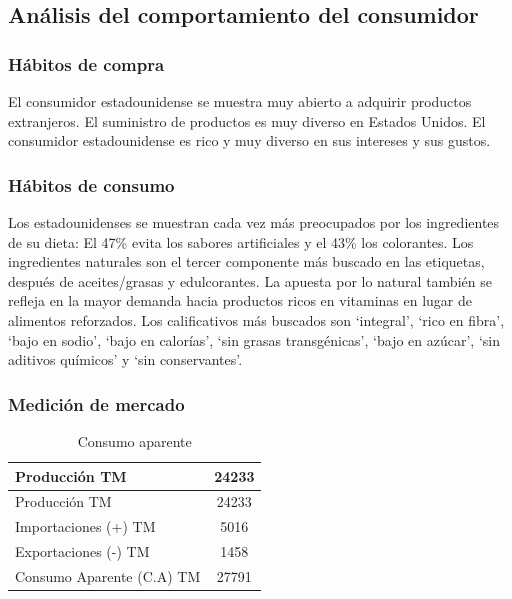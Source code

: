 \documentclass[
  stu,
  floatsintext,
  longtable,
  a4paper,
  nolmodern,
  notxfonts,
  notimes,
  12pt,
  colorlinks=true,linkcolor=blue,citecolor=blue,urlcolor=blue]{apa7}
\begin{document}
\subsection{Análisis del comportamiento del
consumidor}\label{anuxe1lisis-del-comportamiento-del-consumidor}

\subsubsection{Hábitos de compra}\label{huxe1bitos-de-compra}

El consumidor estadounidense se muestra muy abierto a adquirir productos
extranjeros. El suministro de productos es muy diverso en Estados
Unidos. El consumidor estadounidense es rico y muy diverso en sus
intereses y sus gustos.

\subsubsection{Hábitos de consumo}\label{huxe1bitos-de-consumo}

Los estadounidenses se muestran cada vez más preocupados por los
ingredientes de su dieta: El 47\% evita los sabores artificiales y el
43\% los colorantes. Los ingredientes naturales son el tercer componente
más buscado en las etiquetas, después de aceites/grasas y edulcorantes.
La apuesta por lo natural también se refleja en la mayor demanda hacia
productos ricos en vitaminas en lugar de alimentos reforzados. Los
calificativos más buscados son `integral', `rico en fibra', `bajo en
sodio', `bajo en calorías', `sin grasas transgénicas', `bajo en azúcar',
`sin aditivos químicos' y `sin conservantes'.

\subsubsection{Medición de mercado}\label{mediciuxf3n-de-mercado}

\begin{longtable}[]{@{}lc@{}}
\caption{Consumo aparente}\tabularnewline
\toprule\noalign{}
Producción TM & 24233 \\
\midrule\noalign{}
\endfirsthead
\toprule\noalign{}
Producción TM & 24233 \\
\midrule\noalign{}
\endhead
\bottomrule\noalign{}
\endlastfoot
Importaciones (+) TM & 5016 \\
Exportaciones (-) TM & 1458 \\
Consumo Aparente (C.A) TM & 27791 \\
\end{longtable}
\end{document}
